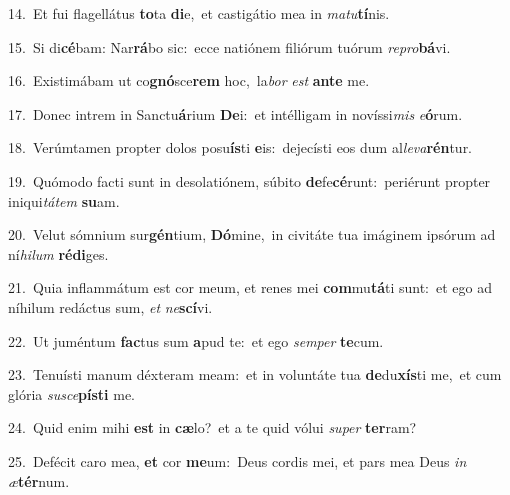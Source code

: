 {\numbfont\textcolor{\numbcolor}{14.}}~Et fui flagellátus \textbf{to}\-ta \textbf{di}\-e,~\star et castigátio mea in \textit{ma}\-\textit{tu}\textbf{tí}nis.\par
{\numbfont\textcolor{\numbcolor}{15.}}~Si di\-\textbf{cé}\-bam: Nar\-\textbf{rá}\-bo sic:~\star ecce natiónem filiórum tuórum \textit{re}\-\textit{pro}\textbf{bá}vi.\par
{\numbfont\textcolor{\numbcolor}{16.}}~Existimábam ut co\-\textbf{gnó}\-sce\textbf{rem} hoc,~\star la\textit{bor} \textit{est} \textbf{an}\-\textbf{te} me.\par
{\numbfont\textcolor{\numbcolor}{17.}}~Donec intrem in Sanctu\-\textbf{á}\-rium \textbf{De}\-i:~\star et intélligam in novíssi\textit{mis} \textit{e}\-\textbf{ó}rum.\par
{\numbfont\textcolor{\numbcolor}{18.}}~Verúmtamen propter dolos posu\-\textbf{ís}\-ti \textbf{e}\-is:~\star dejecísti eos dum al\-\textit{le}\-\textit{va}\textbf{rén}tur.\par
{\numbfont\textcolor{\numbcolor}{19.}}~Quómodo facti sunt in desolatiónem, súbito \textbf{de}\-fe\-\textbf{cé}\-runt:~\star periérunt propter iniqui\-\textit{tá}\-\textit{tem} \textbf{su}\-am.\par
{\numbfont\textcolor{\numbcolor}{20.}}~Velut sómnium sur\-\textbf{gén}\-tium, \textbf{Dó}\-mine,~\star in civitáte tua imáginem ipsórum ad ní\-\textit{hi}\-\textit{lum} \textbf{réd}\-\textbf{i}ges.\par
{\numbfont\textcolor{\numbcolor}{21.}}~Quia inflammátum est cor meum, et renes mei \textbf{com}\-mu\-\textbf{tá}\-ti sunt:~\star et ego ad níhilum redáctus sum, \textit{et} \textit{ne}\-\textbf{scí}vi.\par
{\numbfont\textcolor{\numbcolor}{22.}}~Ut juméntum \textbf{fac}\-tus sum \textbf{a}\-pud te:~\star et ego \textit{sem}\-\textit{per} \textbf{te}\-cum.\par
{\numbfont\textcolor{\numbcolor}{23.}}~Tenuísti manum déxteram meam:~\dagger et in voluntáte tua \textbf{de}\-du\-\textbf{xís}\-ti me,~\star et cum glória \textit{su}\-\textit{sce}\textbf{pís}\textbf{ti} me.\par
{\numbfont\textcolor{\numbcolor}{24.}}~Quid enim mihi \textbf{est} in \textbf{cæ}\-lo?~\star et a te quid vólui \textit{su}\-\textit{per} \textbf{ter}\-ram?\par
{\numbfont\textcolor{\numbcolor}{25.}}~Defécit caro mea, \textbf{et} cor \textbf{me}\-um:~\star Deus cordis mei, et pars mea Deus \textit{in} \textit{æ}\-\textbf{tér}num.\par
